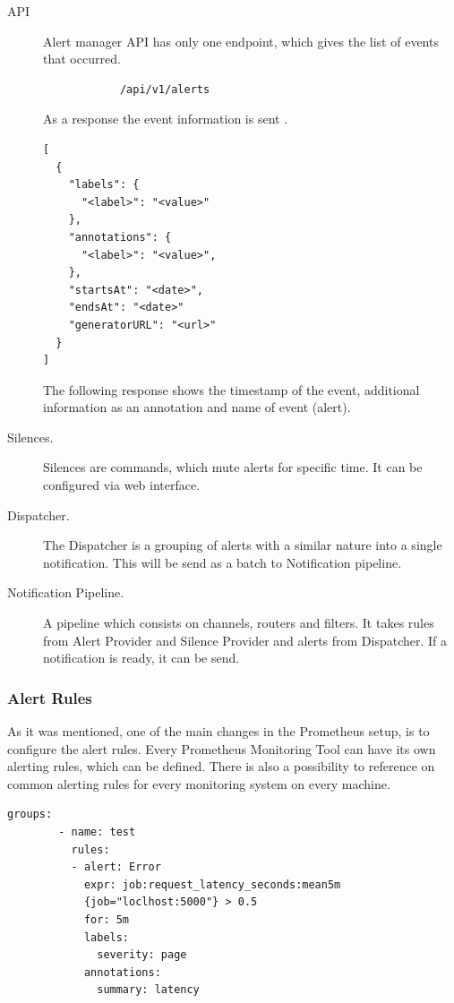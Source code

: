\begin{description}
\item[API] Alert manager API has only one endpoint, which gives the list of events that occurred.
\begin{lstlisting}
            /api/v1/alerts
\end{lstlisting}

As a response the event information is sent \cite{alert_send}.
 \begin{lstlisting}[caption=Querying alert]
 [
  {
    "labels": {
      "<label>": "<value>"
    },
    "annotations": {
      "<label>": "<value>",
    },
    "startsAt": "<date>",
    "endsAt": "<date>"
    "generatorURL": "<url>"
  }
]
\end{lstlisting}
The following response shows the timestamp of the event, additional information as an annotation and name of event (alert). 
\item[Silences.] Silences are commands, which mute alerts for specific time. It can be configured via web interface. 
\item[Dispatcher.] The Dispatcher is a grouping of alerts with a similar nature into a single notification. This will be send as a batch to Notification pipeline.
\item[Notification Pipeline.] A pipeline which consists on channels, routers and filters. It takes rules from Alert Provider and Silence Provider and alerts from Dispatcher. If a notification is ready, it can be send. 
\end{description}


\subsubsection{Alert Rules}\label{Alert Rules}

As it was mentioned, one of the main changes in the Prometheus setup, is to configure the alert rules. Every Prometheus Monitoring Tool can have its own alerting rules, which can be defined. There is also a possibility to reference on common alerting rules for every monitoring system on every machine. 

 \begin{lstlisting}[caption=Alert error response]
        groups:
        - name: test
          rules:
          - alert: Error
            expr: job:request_latency_seconds:mean5m
            {job="loclhost:5000"} > 0.5
            for: 5m
            labels:
              severity: page
            annotations:
              summary: latency
\end{lstlisting}

